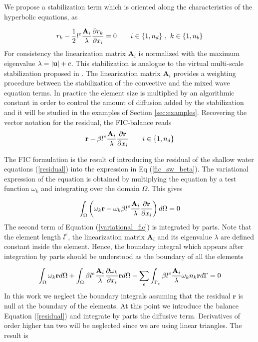 We propose a stabilization term which is oriented along the characteristics of the hyperbolic equations, as

\begin{equation} \label{fic_sw}
r_{k} - \frac{1}{2}l^e\frac{\mathbf{A}_i}{\lambda}\frac{\partial r_k}{\partial x_i} = 0
    \qquad i\in\{1,n_d\} \ ,\ k\in\{1,n_b\}
\end{equation}
For consistency the linearization matrix $\mathbf{A}_i$ is normalized with the maximum eigenvalue $\lambda=\lvert\mathbf{u}\rvert + c$. This stabilization is analogue to the virtual multi-scale stabilization proposed in \cite{codina2008b}. The linearization matrix $\mathbf{A}_i$ provides a weighting procedure between the stabilization of the convective and the mixed wave equation terms. In practice the element size is multiplied by an algorithmic constant in order to control the amount of diffusion added by the stabilization and it will be studied in the examples of Section \ref{sec:examples}. Recovering the vector notation for the residual, the FIC-balance reads
\begin{equation} \label{fic_sw_beta}
\mathbf{r} - \beta l^e\frac{\mathbf{A}_i}{\lambda}\frac{\partial\mathbf{r}}{\partial x_i}
    \qquad i\in\{1,n_d\}
\end{equation}

The FIC formulation is the result of introducing the residual of the shallow water equations (\ref{residual}) into the expression in Eq (\ref{fic_sw_beta}). The variational expression of the equation is obtained by multiplying the equation by a test function $\omega_k$ and integrating over the domain $\Omega$. This gives

\begin{equation} \label{variational_fic}
\int_\Omega \left(
    \omega_k \mathbf{r} - \omega_k \beta l^e\frac{\mathbf{A}_i}{\lambda}\frac{\partial\mathbf{r}}{\partial x_i}
\right) d\Omega = 0
\end{equation}
The second term of Equation (\ref{variational_fic}) is integrated by parts. Note that the element length $l^e$, the linearization matrix $\mathbf{A}_i$ and its eigenvalue $\lambda$ are defined constant inside the element. Hence, the boundary integral which appears after integration by parts should be understood as the boundary of all the elements

\begin{equation} \label{variational_fic_parts}
\int_\Omega \omega_k \mathbf{r} d\Omega
+ \int_\Omega \beta l^e\frac{\mathbf{A}_i}{\lambda}\frac{\partial\omega_k}{\partial x_i} \mathbf{r} d\Omega
- \sum_e \int_{\Gamma_e} \beta l^e\frac{\mathbf{A}_i}{\lambda}\omega_kn_k \mathbf{r} d\Gamma = 0
\end{equation}
In this work we neglect the boundary integrals assuming that the residual $\mathbf{r}$ is null at the boundary of the elements. At this point we introduce the balance Equation (\ref{residual}) and integrate by parts the diffusive term.
Derivatives of order higher tan two will be neglected since we are using linear triangles.
The result is

